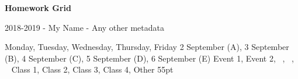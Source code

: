 \documentclass{hwgrid}
\begin{document}
{\Large\bfseries Homework Grid}

\vspace{0.25cm}

{\large 2018-2019 - My Name - Any other metadata}

\insertgridfixed
 {Monday, Tuesday, Wednesday, Thursday, Friday}
 {
   2 September (A),
   3 September (B),
   4 September (C),
   5 September (D),
   6 September (E)
 }
 {
   Event 1,
   Event 2,
   ~,
   ~,
   ~
 }
 {
   Class 1,
   Class 2,
   Class 3,
   Class 4,
   Other
 }
 {55pt}
\end{document}
